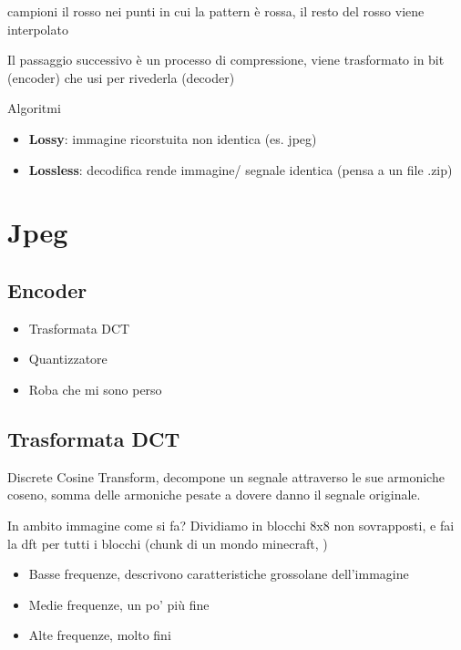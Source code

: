 \documentclass[11pt]{article}
\begin{document}
campioni il rosso nei punti in cui la pattern è rossa, il resto del
rosso viene interpolato\par

Il passaggio successivo è un processo di compressione, viene
trasformato in bit (encoder) che usi per rivederla (decoder)

Algoritmi
\begin{itemize}
\item \textbf{Lossy}: immagine ricorstuita non identica (es. jpeg)
\item \textbf{Lossless}: decodifica rende immagine/ segnale identica (pensa
a un file .zip)
\end{itemize}

\section{Jpeg}
\label{sec:org8639e5c}

\subsection{Encoder}
\label{sec:org551354e}

\begin{itemize}
\item Trasformata DCT
\item Quantizzatore
\item Roba che mi sono perso
\end{itemize}

\subsection{Trasformata DCT}
\label{sec:org1ce04d8}

Discrete Cosine Transform, decompone un segnale attraverso le sue
armoniche coseno, somma delle armoniche pesate a dovere danno il
segnale originale.

In ambito immagine come si fa? Dividiamo in blocchi 8x8 non
sovrapposti, e fai la dft per tutti i blocchi
(chunk di un mondo minecraft, \textpm{})

\begin{itemize}
\item Basse frequenze, descrivono caratteristiche grossolane dell'immagine
\item Medie frequenze, un po' più fine
\item Alte frequenze, molto fini
\end{itemize}
\end{document}
